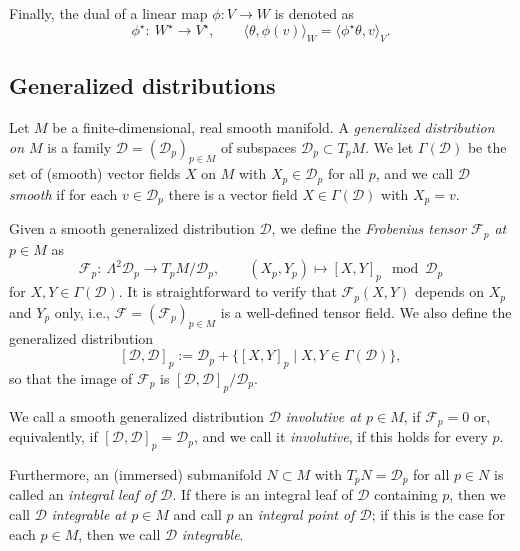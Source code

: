 \documentclass[10pt,a4paper]{amsart}
\numberwithin{equation}{section}
\newcommand{\ee}{\end{equation}}
\newcommand{\dcal}{\mathcal{D}}
\begin{document}
Finally, the dual of a linear map $\phi\colon V \to W$ is denoted as
\[
\phi^\star\colon\ W^\star \longrightarrow V^\star, \qquad \langle \theta, \phi(v) \rangle_W = \langle \phi^\star \theta, v \rangle_V.
\]


\subsection{Generalized distributions}


Let $M$ be a finite-dimensional, real smooth manifold.
A {\em generalized distribution on $M$} is a family $\dcal = (\dcal_p)_{p \in M}$ of subspaces $\dcal_p \subset T_pM$.
We let $\Gamma(\dcal)$ be the set of (smooth) vector fields $X$ on $M$ with $X_p \in \dcal_p$ for all $p$, and we call $\dcal$ {\em smooth} if for each $v \in \dcal_p$ there is a vector field $X \in \Gamma(\dcal)$ with $X_p = v$.

Given a smooth generalized distribution $\dcal$, we define the {\em Frobenius tensor ${\mathcal F}_p$ at $p \in M$} as
\[
{\mathcal F}_p\colon\ \Lambda^2 \dcal_p \longrightarrow T_pM/\dcal_p, \qquad (X_p, Y_p) \longmapsto [X,Y]_p \mod \dcal_p
\]
for $X, Y \in \Gamma(\dcal)$. It is straightforward to verify that ${\mathcal F}_p(X, Y)$ depends on $X_p$ and $Y_p$ only, i.e., ${\mathcal F} = ({\mathcal F}_p)_{p \in M}$ is a well-defined tensor field. We also define the generalized distribution
\[%
{}[\dcal, \dcal]_p := \dcal_p + \{ [X, Y]_p \mid X, Y \in \Gamma(\dcal)\},
\]
so that the image of ${\mathcal F}_p$ is $[\dcal, \dcal]_p/\dcal_p$.

\begin{Definition}
We call a smooth generalized distribution $\dcal$ {\em involutive at $p \in M$}, if ${\mathcal F}_p = 0$ or, equivalently, if $[\dcal, \dcal]_p = \dcal_p$, and we call it {\em involutive}, if this holds for every $p$.

Furthermore, an (immersed) submanifold $N \subset M$ with $T_pN = \dcal_p$ for all $p \in N$ is called an {\em integral leaf of $\dcal$}. If there is an integral leaf of $\dcal$ containing $p$, then we call $\dcal$ {\em integrable at $p \in M$} and call $p$ an {\em integral point of $\dcal$}; if this is the case for each $p \in M$, then we call $\dcal$ {\em integrable}.
\end{Definition}
\end{document}
